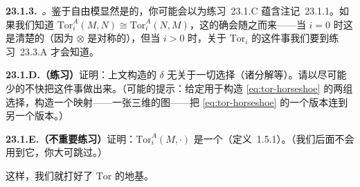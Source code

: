 \textbf{23.1.3.}\ \emph{\trhCaveat。}\quad 鉴于自由模显然是\trFlat{}的，你可能会以为\mbox{练习~23.1.C} 蕴含\mbox{注记~23.1.1}。如果我们知道 $\mathrm{Tor}^A_i(M,N)\cong\mathrm{Tor}^A_i(N,M)$，这的确会随之而来——当 $i=0$ 时这是清楚的（因为 $\otimes$ 是对称的），但当 $i>0$ 时，关于 $\mathrm{Tor}_i$ 的这件事我们要到\mbox{练习~23.3.A} 才会知道。

\textbf{23.1.D.（练习）}\quad 证明：上文构造的\trConnectingHomomorphism{} $\delta$ 无关于一切选择（诸分解等）。请以尽可能少的不快把这件事做出来。（可能的提示：给定用于构造 \eqref{eq:tor-horseshoe} 的两组选择，构造一个映射——一张三维的图——把 \eqref{eq:tor-horseshoe} 的一个版本连到另一个版本。）

\textbf{23.1.E.（不重要练习）}\quad 证明：$\mathrm{Tor}^A_i(M,\cdot)$ 是一个\trAdditiveFunctor（\mbox{定义~1.5.1}）。（我们后面不会用到它，你大可跳过。）

这样，我们就打好了 $\mathrm{Tor}$ 的地基。


